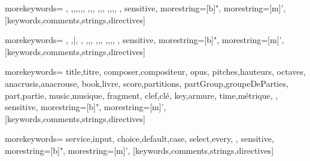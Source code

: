 


%
  {%
  morekeywords={%
  	\version,%
  	\header,\paper,\score,\book,\layout,\midi,%
		\new,\context,\with,%
		\absolute,\relative,\fixed,%
		\language,\clef,\key,\time,%
	},%
  sensitive,%
  morestring=[b]",%
  morestring=[m]', %
}[keywords,comments,strings,directives]%





%
  {%
  morekeywords={%
  	\staff,%
		\barFormat,\bar,%
  	\beamsOff,%
		\new,\context,\with,%
		\absolute,\relative,\fixed,%
		\language,\clef,\key,\time,%
	},%
  sensitive,%
  morestring=[b]",%
  morestring=[m]', %
}[keywords,comments,strings,directives]%





%
  {%
  morekeywords={%
  	title,titre,%
		composer,compositeur,%
		opus,%
  	pitches,hauteurs,%
		octaves,%
		anacrusis,anacrouse,%
		book,livre,%
		score,partitions,%
		partGroup,groupeDeParties,%
		part,partie,%
  	music,musique,%
		fragment,%
		clef,clé,%
		key,armure,%
		time,métrique,%
	},%
  sensitive,%
  morestring=[b]",%
  morestring=[m]', %
}[keywords,comments,strings,directives]%





%
  {%
  morekeywords={%
  	service,input,%
		choice,default,case,%
		select,every,%
	},%
  sensitive,%
  morestring=[b]",%
  morestring=[m]', %
}[keywords,comments,strings,directives]%

